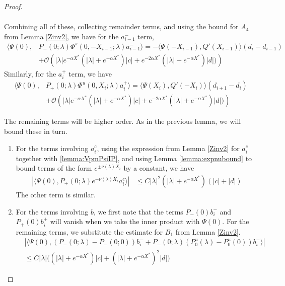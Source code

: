 \documentclass[thesis.tex]{subfiles}
\begin{document}
\begin{lemma}
\begin{proof}
\begin{enumerate}
\begin{align*}
\end{align*}
Combining all of these, collecting remainder terms, and using the bound for $A_4$ from Lemma \ref{Zinv2}, we have for the $a_{i-1}^-$ term,
\begin{align*}
\langle \Psi(0), &P_-(0; \lambda) \Phi^s(0, -X_{i-1}; \lambda) a_{i-1}^- \rangle = -\langle \Psi(-X_{i-1}), Q'(X_{i-1}) \rangle (d_i - d_{i-1} ) \\
&+ \mathcal{O} \left( |\lambda|e^{-\alpha X^*}(|\lambda| + e^{-\alpha X^*})|c| + e^{-2 \alpha X^*} (|\lambda| + e^{-\alpha X^*}) |d| ) \right)
\end{align*}
Similarly, for the $a_i^+$ term, we have
\begin{align*}
\langle \Psi(0), &P_+(0; \lambda) \Phi^u(0, X_i; \lambda) a_i^+ \rangle = \langle \Psi(X_i), Q'(-X_i) \rangle (d_{i+1} - d_i ) \\
&+ \mathcal{O} \left( |\lambda|e^{-\alpha X^*}(|\lambda| + e^{-\alpha X^*})|c| + e^{-2 \alpha X^*} (|\lambda| + e^{-\alpha X^*}) |d| ) \right)
\end{align*}

\end{enumerate}

The remaining terms will be higher order. As in the previous lemma, we will bound these in turn.

\begin{enumerate}

\item For the terms involving $a_i^c$, using the expression from Lemma \ref{Zinv2} for $a_i^c$ together with \cref{lemma:VpmPsiIP}, and using Lemma \ref{lemma:expnubound} to bound terms of the form $e^{\pm \nu(\lambda)X_i}$ by a constant, we have
\begin{align*}
|\langle \Psi(0), P_+(0; \lambda) e^{-\nu(\lambda)X_i} a_i^c \rangle| &\leq C |\lambda|^2 (|\lambda| + e^{-\alpha X^*}) \left( |c| + |d| \right)
\end{align*}
The other term is similar.

\item For the terms involving $b$, we first note that the terms $P_-(0) b_i^-$ and $P_+(0)b_i^+$ will vanish when we take the inner product with $\Psi(0)$. For the remaining terms, we substitute the estimate for $B_1$ from Lemma \ref{Zinv2}.
\begin{align*}
&|\langle \Psi(0), (P_-(0; \lambda) - P_-(0; 0))b_i^- + P_-(0; \lambda)(P_0^u(\lambda) - P_0^u(0))b_i^- \rangle | \\
&\leq C |\lambda| \Big( (|\lambda| + e^{-\alpha X^*})|c| + (|\lambda| + e^{-\alpha X^*})^2 |d| \Big)
\end{align*}


\end{enumerate}
\end{proof}
\end{lemma}
\end{document}
